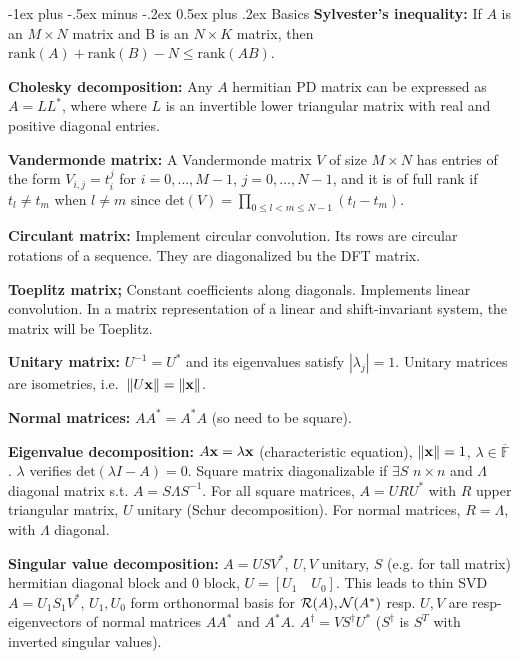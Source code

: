 \documentclass{article}
\makeatletter
\renewcommand{\section}{\@startsection{section}{1}{0mm}%
                                {-1ex plus -.5ex minus -.2ex}%
                                {0.5ex plus .2ex}%
                                {\color{blue!60}\normalfont\normalsize\bfseries}}
\makeatother
\begin{document}
\fontsize{7pt}{8pt}\selectfont

\begin{multicols*}{3}
\setlength{\premulticols}{1pt}
\setlength{\postmulticols}{1pt}
\setlength{\multicolsep}{1pt}
\setlength{\columnsep}{2pt}
    \section{Basics}
    \textbf{Sylvester’s inequality: }If $A$ is an $M\times N$ matrix and B is an $N\times K$ matrix, then $\text{rank}(A) + \text{rank}(B) - N \leq \text{rank}(AB)$.
    
    \textbf{Cholesky decomposition: }Any $A$ hermitian PD matrix can be expressed as $A=LL^*$, where where $L$ is an invertible lower triangular matrix with real and positive diagonal entries.
    
    \textbf{Vandermonde matrix: }A Vandermonde matrix $V$ of size $M \times N$ has entries of the form $V_{i,j} = t_i^j$ for $i=0,\dots,M-1$, $j=0,\dots,N-1$, and it is of full rank if $t_l \neq t_m$ when $l\neq m$ since $\text{det}(V)=\prod_{0\leq l < m \leq N-1}(t_l-t_m)$.
    
    \textbf{Circulant matrix: }Implement circular convolution. Its rows are circular rotations of a sequence. They are diagonalized bu the DFT matrix.
    
    \textbf{Toeplitz matrix; }Constant coefficients along diagonals. Implements linear convolution. In a matrix representation of a linear and shift-invariant system, the matrix will be Toeplitz.
    
    \textbf{Unitary matrix: }$U^{-1}=U^*$ and its eigenvalues satisfy $|\lambda_j|=1$. Unitary matrices are isometries, i.e.\ $\left\lVert U\mathbf{x}\right\rVert=\left\lVert\mathbf{x}\right\rVert$.
    
     \textbf{Normal matrices: }$AA^*=A^*A$ (so need to be square).
    
    \textbf{Eigenvalue decomposition: }$A\mathbf{x} =\lambda \mathbf{x}$ (characteristic equation), $\left\lVert\mathbf{x}\right\rVert=1$, $\lambda \in \overline{\mathbb{F}}$. $\lambda$ verifies $\text{det}(\lambda I - A)=0$. Square matrix diagonalizable if $\exists S$ $n\times n$ and $\Lambda$ diagonal matrix s.t. $A=S\Lambda S^{-1}$. For all square matrices, $A=URU^*$ with $R$ upper triangular matrix, $U$ unitary (Schur decomposition). For normal matrices, $R=\Lambda$, with $\Lambda$ diagonal.
    
    \textbf{Singular value decomposition: }$A=USV^*$, $U,V$ unitary, $S$ (e.g. for tall matrix) hermitian diagonal block and 0 block, $U=[U_1 \quad U_0]$. This leads to thin SVD $A=U_1 S_1 V^*$, $U_1,U_0$ form orthonormal basis for $\mathcal{R}(A),\mathcal{N}(A^*)$ resp. $U,V$ are resp- eigenvectors of normal matrices $AA^*$ and $A^*A$. $A^\dagger = VS^\dagger U^*$ ($S^\dagger$ is $S^T$ with inverted singular values).
    

\end{multicols*}
\end{document}
